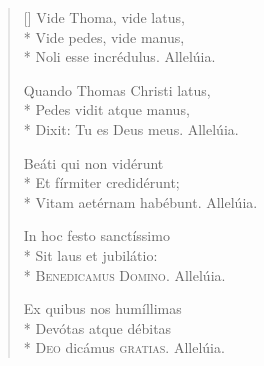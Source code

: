 \begin{verse}[\versewidth]
Vide Thoma, vide latus,\\*
Vide pedes, vide manus,   \\*
Noli esse incrédulus.     Allelúia. 

Quando Thomas Christi latus,\\*%
Pedes vidit atque manus,\\*%
Dixit: Tu es Deus meus.           
                                 Allelúia.

Beáti qui non vidérunt \\*  
Et fírmiter credidérunt; \\*
Vitam aetérnam habébunt. 
                        Allelúia.  

In hoc festo sanctíssimo\\*
Sit laus et jubilátio:   \\*
\textsc{Benedicamus Domino.}
                        Allelúia.  

Ex quibus nos humíllimas\\*
Devótas atque débitas    \\*
\textsc{Deo} dicámus \textsc{gratias.}
                        Allelúia.

\end{verse}



